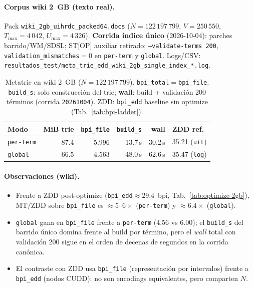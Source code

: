 \paragraph{Corpus wiki 2~GB (texto real).}
Pack \texttt{wiki\_2gb\_uihrdc\_packed64.docs} ($N=122\,197\,799$, $V=250\,550$,
$T_{\max}=4\,042$, $U_{\max}=4\,326$).
\textbf{Corrida índice único} (2026-10-04): parches barrido/WM/SDSL; ST[OP] auxiliar
retirado; \texttt{--validate-terms 200}, \texttt{validation\_mismatches}$=0$
en \texttt{per-term} y \texttt{global}.
Logs/CSV: \texttt{resultados\_test/meta\_trie\_edd\_wiki\_2gb\_single\_index\_*.log}.

\begin{table}[htbp]
\centering
\caption{Metatrie en wiki 2~GB ($N=122\,197\,799$). \texttt{bpi\_total}$=$\texttt{bpi\_file}.
\texttt{build\_s}: solo construcción del trie; \textbf{wall}: build + validación 200 términos
(corrida \texttt{20261004}). ZDD: \texttt{bpi\_edd} baseline sin optimize (Tab.~\ref{tab:bpi-ladder}).}
\label{tab:metatrie-wiki-2gb}
\small
\begin{tabular}{l r r r r l}
\hline
Modo & MiB trie & \texttt{bpi\_file} & \texttt{build\_s} & wall & ZDD ref. \\
\hline
\texttt{per-term} & 87.4 & 5.996 & 13.7\,s & 30.2\,s & 35.21 (\texttt{u+t}) \\
\texttt{global}   & 66.5 & 4.563 & 48.0\,s & 62.6\,s & 35.47 (\texttt{log}) \\
\hline
\end{tabular}
\end{table}

\paragraph{Observaciones (wiki).}
\begin{itemize}
\item Frente a ZDD post-optimize (\texttt{bpi\_edd}$\approx 29.4$~bpi, Tab.~\ref{tab:optimize-2gb}),
      $\mathrm{MT}/\mathrm{ZDD}$ sobre \texttt{bpi\_file} es $\approx 5$--$6\times$
      (\texttt{per-term}) y $\approx 6.4\times$ (\texttt{global}).
\item \texttt{global} gana en \texttt{bpi\_file} frente a \texttt{per-term} (4.56 vs 6.00);
      el \texttt{build\_s} del barrido único domina frente al build por término, pero el
      \emph{wall} total con validación 200 sigue en el orden de decenas de segundos en la
      corrida canónica.
\item El contraste con ZDD usa \texttt{bpi\_file} (representación por intervalos) frente a
      \texttt{bpi\_edd} (nodos CUDD); no son encodings equivalentes, pero comparten $N$.
\end{itemize}

